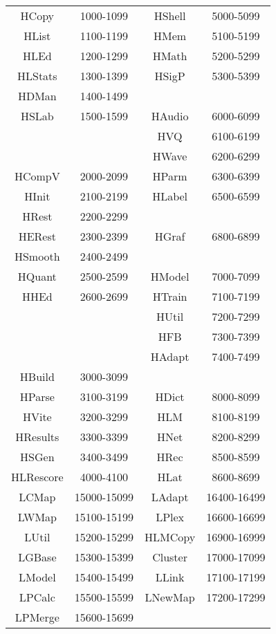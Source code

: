\begin{itemize}
\begin{center}
\begin{tabular}{|c|c|c|c|}
\hline
HCopy    & 1000-1099     & HShell        & 5000-5099    \\
HList    & 1100-1199     & HMem          & 5100-5199    \\
HLEd     & 1200-1299     & HMath         & 5200-5299    \\
HLStats  & 1300-1399     & HSigP         & 5300-5399    \\
HDMan    & 1400-1499     &               &              \\
HSLab    & 1500-1599     & HAudio        & 6000-6099    \\
         &               & HVQ           & 6100-6199    \\
         &               & HWave         & 6200-6299    \\
HCompV   & 2000-2099     & HParm         & 6300-6399    \\
HInit    & 2100-2199     & HLabel        & 6500-6599    \\
HRest    & 2200-2299     &               &              \\
HERest   & 2300-2399     & HGraf         & 6800-6899    \\
HSmooth  & 2400-2499     &               &              \\
HQuant   & 2500-2599     & HModel        & 7000-7099    \\
HHEd     & 2600-2699     & HTrain        & 7100-7199    \\
         &               & HUtil         & 7200-7299    \\
         &               & HFB           & 7300-7399    \\
         &               & HAdapt        & 7400-7499    \\
HBuild   & 3000-3099     &               &              \\
HParse   & 3100-3199     & HDict         & 8000-8099    \\
HVite    & 3200-3299     & HLM           & 8100-8199    \\
HResults & 3300-3399     & HNet          & 8200-8299    \\
HSGen    & 3400-3499     & HRec          & 8500-8599    \\
HLRescore& 4000-4100     & HLat          & 8600-8699    \\
\hline
LCMap    & 15000-15099   & LAdapt        & 16400-16499  \\
LWMap    & 15100-15199   & LPlex         & 16600-16699  \\
LUtil    & 15200-15299   & HLMCopy       & 16900-16999  \\
LGBase   & 15300-15399   & Cluster       & 17000-17099  \\
LModel   & 15400-15499   & LLink         & 17100-17199  \\
LPCalc   & 15500-15599   & LNewMap       & 17200-17299  \\
LPMerge  & 15600-15699   &               &              \\
\hline
\end{tabular}
\end{center}


\end{itemize}
